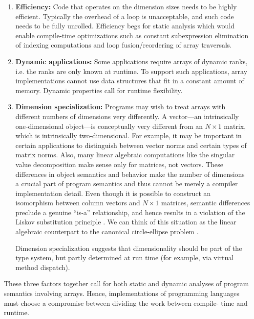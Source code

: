 \documentclass[preprint]{sigplanconf}
\begin{document}
\begin{enumerate}

\item{\bf Efficiency:} Code that operates on the dimension sizes needs to be
highly efficient. Typically the overhead of a loop is unacceptable, and such
code needs to be fully unrolled. Efficiency begs for static analysis which
would enable compile-time optimizations such as constant subexpression
elimination of indexing computations and loop fusion/reordering of array
traversals.

\item{\bf Dynamic applications:} Some applications require arrays of dynamic
ranks, i.e. the ranks are only known at runtime. To support such applications,
array implementations cannot use data structures that fit in a constant amount
of memory. Dynamic properties call for runtime flexibility.

\item {\bf Dimension specialization:} Programs may wish to treat arrays with
different numbers of dimensions very differently. A vector---an intrinsically
one-dimensional object---is conceptually very different from an $N\times1$
matrix, which is intrinsically two-dimensional. For example, it may be
important in certain applications to distinguish between vector norms and
certain types of matrix norms. Also, many linear algebraic computations like
the singular value decomposition make sense only for matrices, not vectors.
These differences in object semantics and behavior make the number of
dimensions a crucial part of program semantics and thus cannot be merely a
compiler implementation detail. Even though it is possible to construct an
isomorphism between column vectors and $N\times1$ matrices, semantic
differences preclude a genuine ``is-a'' relationship, and hence results in a
violation of the Liskov substitution principle \cite{Liskov:1987da}. We can
think of this situation as the linear algebraic counterpart to the canonical
circle-ellipse problem \cite{Halbert:1987ut}.

Dimension specialization suggests that dimensionality should be part of the
type system, but partly determined at run time (for example, via virtual
method dispatch).

\end{enumerate}

These three factors together call for both static and dynamic analyses of
program semantics involving arrays. Hence, implementations of programming
languages must choose a compromise between dividing the work between compile-
time and runtime.
\end{document}

